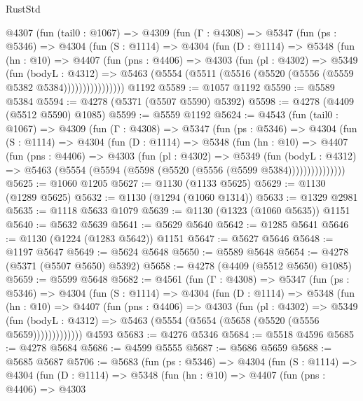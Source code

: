 \begin{lexlean}{RustStd}
\begin{coremodule}
{\begin{coremodule}
{{{{{{{{{{{{{{{{{{{{{{{{{{{{{{{{{{{    @4307
      (fun (tail0 : @1067) =>
      @4309
        (fun (Γ : @4308) =>
        @5347
          (fun (ps : @5346) =>
          @4304
            (fun (S : @1114) =>
            @4304
              (fun (D : @1114) =>
              @5348
                (fun (hn : @10) =>
                @4407
                  (fun (pns : @4406) =>
                  @4303
                    (fun (pl : @4302) =>
                    @5349
                      (fun (bodyL : @4312) =>
                      @5463 (@5554 (@5511 (@5516 (@5520 (@5556 (@5559 @5382 @5384))))))))))))))))
    @1192
@5589 := @1057 @1192
@5590 := @5589 @5384
@5594 := @4278 (@5371 (@5507 @5590) @5392)
@5598 := @4278 (@4409 (@5512 @5590) @1085)
@5599 := @5559 @1192
@5624 := @4543
    (fun (tail0 : @1067) =>
    @4309
      (fun (Γ : @4308) =>
      @5347
        (fun (ps : @5346) =>
        @4304
          (fun (S : @1114) =>
          @4304
            (fun (D : @1114) =>
            @5348
              (fun (hn : @10) =>
              @4407
                (fun (pns : @4406) =>
                @4303
                  (fun (pl : @4302) =>
                  @5349
                    (fun (bodyL : @4312) =>
                    @5463 (@5554 (@5594 (@5598 (@5520 (@5556 (@5599 @5384)))))))))))))))
@5625 := @1060 @1205
@5627 := @1130 (@1133 @5625)
@5629 := @1130 (@1289 @5625)
@5632 := @1130 (@1294 (@1060 @1314))
@5633 := @1329 @2981
@5635 := @1118 @5633 @1079
@5639 := @1130 (@1323 (@1060 @5635)) @1151
@5640 := @5632 @5639
@5641 := @5629 @5640
@5642 := @1285 @5641
@5646 := @1130 (@1224 (@1283 @5642)) @1151
@5647 := @5627 @5646
@5648 := @1197 @5647
@5649 := @5624 @5648
@5650 := @5589 @5648
@5654 := @4278 (@5371 (@5507 @5650) @5392)
@5658 := @4278 (@4409 (@5512 @5650) @1085)
@5659 := @5599 @5648
@5682 := @4561
    (fun (Γ : @4308) =>
    @5347
      (fun (ps : @5346) =>
      @4304
        (fun (S : @1114) =>
        @4304
          (fun (D : @1114) =>
          @5348
            (fun (hn : @10) =>
            @4407
              (fun (pns : @4406) =>
              @4303
                (fun (pl : @4302) =>
                @5349
                  (fun (bodyL : @4312) =>
                  @5463 (@5554 (@5654 (@5658 (@5520 (@5556 @5659)))))))))))))
    @4593
@5683 := @4276 @5346
@5684 := @5518 @4596
@5685 := @4278 @5684
@5686 := @4599 @5555
@5687 := @5686 @5659
@5688 := @5685 @5687
@5706 := @5683
    (fun (ps : @5346) =>
    @4304
      (fun (S : @1114) =>
      @4304
        (fun (D : @1114) =>
        @5348
          (fun (hn : @10) =>
          @4407
            (fun (pns : @4406) =>
            @4303
}}}}}}}}}}}}}}}}}}}}}}}}}}}}}}}}}}}
\end{coremodule}}
\end{coremodule}
\end{lexlean}
